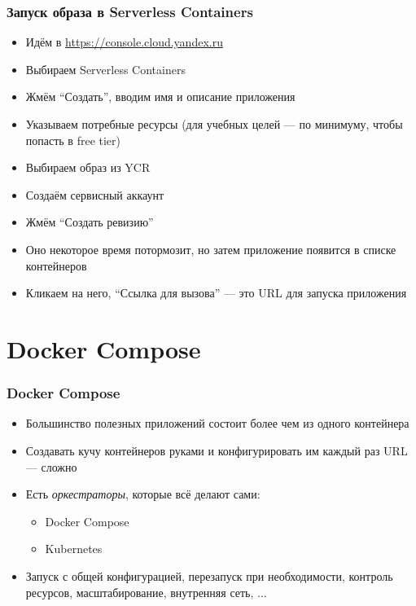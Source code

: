 \documentclass{../../slides-style}
\begin{document}
    \begin{frame}
        \frametitle{Запуск образа в Serverless Containers}
        \begin{itemize}
            \item Идём в \url{https://console.cloud.yandex.ru}
            \item Выбираем Serverless Containers
            \item Жмём \enquote{Создать}, вводим имя и описание приложения
            \item Указываем потребные ресурсы (для учебных целей --- по минимуму, чтобы попасть в free tier)
            \item Выбираем образ из YCR
            \item Создаём сервисный аккаунт
            \item Жмём \enquote{Создать ревизию}
            \item Оно некоторое время потормозит, но затем приложение появится в списке контейнеров
            \item Кликаем на него, \enquote{Ссылка для вызова} --- это URL для запуска приложения
        \end{itemize}
    \end{frame}

    \section{Docker Compose}

    \begin{frame}
        \frametitle{Docker Compose}
        \begin{itemize}
            \item Большинство полезных приложений состоит более чем из одного контейнера
            \item Создавать кучу контейнеров руками и конфигурировать им каждый раз URL --- сложно
            \item Есть \emph{оркестраторы}, которые всё делают сами:
            \begin{itemize}
                \item Docker Compose
                \item Kubernetes
            \end{itemize}
            \item Запуск с общей конфигурацией, перезапуск при необходимости, контроль ресурсов, масштабирование, внутренняя сеть, ...
        \end{itemize}
    \end{frame}
\end{document}
